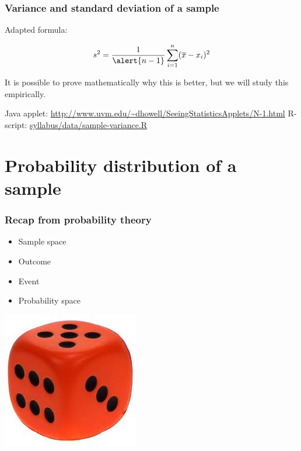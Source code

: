 \documentclass{beamer}
\begin{document}
\begin{frame}
  \frametitle{Variance and standard deviation of a sample}

  \begin{center}
    Adapted formula:

    \begin{equation*}
    s^2 = \frac{1}{\alert{n-1}} \sum_{i=1}^{n} (\overline{x} - x_i)^2
    \end{equation*}

    It is possible to prove mathematically why this is better, but we will study this empirically.

    \vfill

    Java applet: \url{http://www.uvm.edu/~dhowell/SeeingStatisticsApplets/N-1.html}
    \vfill
    R-script: \href{https://github.com/HoGentTIN/research-techniques-course/blob/master/syllabus/data/sample-variance.R}{syllabus/data/sample-variance.R}
  \end{center}
\end{frame}

\section{Probability distribution of a sample}

\begin{frame}
  \frametitle{Recap from probability theory}

  \begin{itemize}
    \item Sample space
    \item Outcome
    \item Event
    \item Probability space
  \end{itemize}

  \vfill

  \hfill \includegraphics[width=.2\textwidth]{img/les04-dobbelsteen}
\end{frame}
\end{document}
